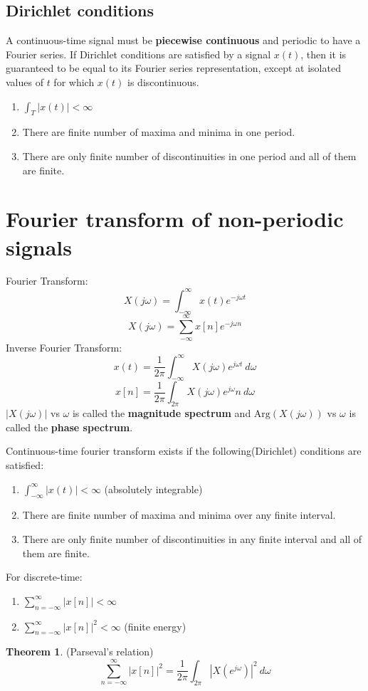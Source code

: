 \documentclass[10pt, a4paper]{extarticle}
\theoremstyle{definition}
\newtheorem*{thm}{Theorem}
\begin{document}
\subsection{Dirichlet conditions}
A continuous-time signal must be \textbf{piecewise continuous} and periodic to have a Fourier series. If Dirichlet conditions are satisfied by a signal $x(t)$, then it is guaranteed to be equal to its Fourier series representation, except at isolated values of $t$ for which $x(t)$ is discontinuous.
\begin{enumerate}
	\item $\int_T |x(t)|<\infty$
	\item There are finite number of maxima and minima in one period.
	\item There are only finite number of discontinuities in one period and all of them are finite.
\end{enumerate}

\section{Fourier transform of non-periodic signals}
Fourier Transform:
\[X(j\omega)=\int_{-\infty}^{\infty}x(t)e^{-j\omega t}\]
\[X(j\omega)=\sum_{-\infty}^{\infty}x[n]e^{-j\omega n}\]
Inverse Fourier Transform:
\[x(t)=\frac{1}{2\pi}\int_{-\infty}^{\infty}X(j\omega)e^{j\omega t}\ d\omega\]
\[x[n]=\frac{1}{2\pi}\int_{2\pi}X(j\omega)e^{j\omega}n\ d\omega\]
$|X(j\omega)|$ vs $\omega$ is called the \textbf{magnitude spectrum} and $\text{Arg}(X(j\omega))$ vs $\omega$ is called the \textbf{phase spectrum}.

Continuous-time fourier transform exists if the following(Dirichlet) conditions are satisfied:
\begin{enumerate}
	\item $\int_{-\infty}^{\infty} |x(t)|<\infty$ (absolutely integrable)
	\item There are finite number of maxima and minima over any finite interval.
	\item There are only finite number of discontinuities in any finite interval and all of them are finite.
\end{enumerate}
For discrete-time:
\begin{enumerate}
	\item $\sum_{n=-\infty}^{\infty}|x[n]|<\infty$
	\item $\sum_{n=-\infty}^{\infty}|x[n]|^2<\infty$ (finite energy)
\end{enumerate}
\begin{thm}(Parseval's relation)
	\[\sum_{n=-\infty}^{\infty}|x[n]|^2=\frac{1}{2\pi}\int_{2\pi}|X(e^{j\omega})|^2\ d\omega\]
\end{thm}
\end{document}
